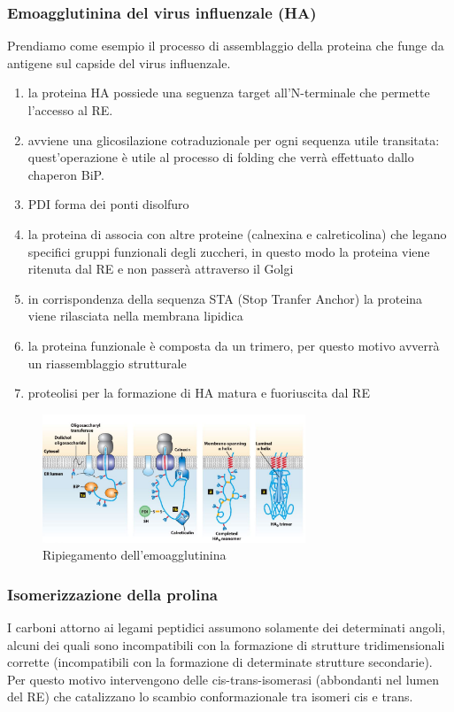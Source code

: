         \subsubsection{Emoagglutinina del virus influenzale (HA)}
            Prendiamo come esempio il processo di assemblaggio della proteina che funge da antigene sul capside del virus influenzale. 
            \begin{enumerate}
                \item la proteina HA possiede una seguenza target all'N-terminale che permette l'accesso al RE. 
                \item avviene una glicosilazione cotraduzionale per ogni sequenza utile transitata: quest'operazione è utile al processo di folding che verrà effettuato dallo chaperon BiP.
                \item PDI forma dei ponti disolfuro
                \item la proteina di associa con altre proteine (calnexina e calreticolina) che legano specifici gruppi funzionali degli zuccheri, in questo modo la proteina viene ritenuta dal RE e non passerà attraverso il Golgi
                \item in corrispondenza della sequenza STA (Stop Tranfer Anchor) la proteina viene rilasciata nella membrana lipidica 
                \item la proteina funzionale è composta da un trimero, per questo motivo avverrà un riassemblaggio strutturale 
                \item proteolisi per la formazione di HA matura e fuoriuscita dal RE
            \end{enumerate}
                \begin{figure}[h]
                \centering
                \includegraphics[width=0.7\textwidth]{images/ripiegamentoHA.JPG}
                \caption{\small Ripiegamento dell'emoagglutinina}
                \label{fig:mesh1}
            \end{figure}
        
        
        \subsubsection{Isomerizzazione della prolina}
            I carboni attorno ai legami peptidici assumono solamente dei determinati angoli, alcuni dei quali sono incompatibili con la formazione di strutture tridimensionali corrette (incompatibili con la formazione di determinate strutture secondarie). 
            Per questo motivo intervengono delle cis-trans-isomerasi (abbondanti nel lumen del RE) che catalizzano lo scambio conformazionale tra isomeri cis e trans.
        
